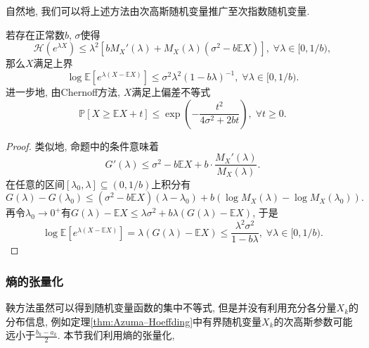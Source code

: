 自然地, 我们可以将上述方法由次高斯随机变量推广至次指数随机变量. 
\begin{proposition}[Bernstein熵的界]\label{thm:BernsteinEntropyBd}
	若存在正常数$b$, $\sigma$使得
	\begin{equation*}
		\mathcal{H}(e^{\lambda X}) 
		\leq \lambda^2 \left[ b M_X'(\lambda) + M_X(\lambda)(\sigma^2 - b \mathbb{E}X) \right],\;
		\forall \lambda \in [0, 1/b), 
	\end{equation*}
	那么$X$满足上界
	\begin{equation*}
		\log \mathbb{E}\left[ e^{\lambda(X - \mathbb{E}X)}\right] 
		\leq \sigma^2 \lambda^2 (1 - b \lambda)^{-1},\; 
		\forall \lambda \in [0, 1/b). 
	\end{equation*}
	进一步地, 由Chernoff方法, $X$满足上偏差不等式
	\begin{equation*}
		\mathbb{P}[X \geq \mathbb{E}X + t] 
		\leq \exp \left(- \frac{t^2}{4 \sigma^2 + 2b t} \right),\;
		\forall t \geq 0. 
	\end{equation*}
\end{proposition}
\begin{proof}
	类似地, 命题中的条件意味着
	\begin{equation*}
		G'(\lambda) 
		\leq \sigma^2 - b \mathbb{E}X + b \cdot \frac{M_X'(\lambda)}{M_X(\lambda)}. 
	\end{equation*}
	在任意的区间$[\lambda_0, \lambda] \subseteq (0, 1/b)$上积分有
	\begin{equation*}
		G(\lambda) - G(\lambda_0) 
		\leq (\sigma^2 - b \mathbb{E}X)(\lambda - \lambda_0) + b(\log M_X(\lambda) - \log M_X(\lambda_0)). 
	\end{equation*}
	再令$\lambda_0 \to 0^+$有$G(\lambda) - \mathbb{E}X \leq \lambda \sigma^2 + b \lambda (G(\lambda) - \mathbb{E}X)$, 于是
	\begin{equation*}
		\log \mathbb{E}\left[e^{\lambda(X - \mathbb{E}X)}\right]
		= \lambda(G(\lambda) - \mathbb{E}X)
		\leq \frac{\lambda^2 \sigma^2}{1 - b \lambda} ,\; 
		\forall \lambda \in [0, 1/b). 
	\end{equation*}
\end{proof}

\subsubsection{熵的张量化}

鞅方法虽然可以得到随机变量函数的集中不等式, 但是并没有利用充分各分量$X_k$的分布信息, 例如定理\ref{thm:Azuma–Hoeffding}中有界随机变量$X_k$的次高斯参数可能远小于$\frac{b_k - a_k}{2}$. 
本节我们利用熵的张量化, 
\sp\sp

